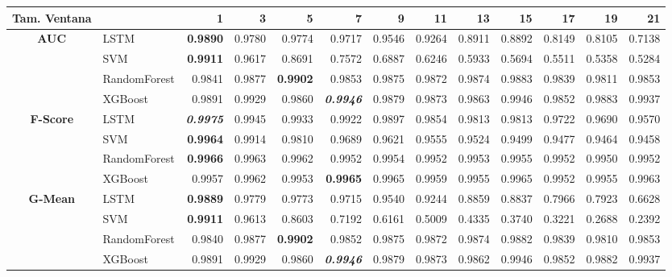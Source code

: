 \begin{table}[H]
	\centering
	\begin{adjustbox}{max width=14cm}
		\begin{tabular}{|c|l|r|r|r|r|r|r|r|r|r|r|r|}
			\hline
			\textbf{Tam. Ventana}&         &      1  &      3  &      5  &      7  &      9  &      11 &      13 &      15 &      17 &      19 &      21 \\
			\hline
			\textbf{AUC} &  LSTM & \textbf{  0.9890 } &  0.9780 &  0.9774 &  0.9717 &  0.9546 &  0.9264 &  0.8911 &  0.8892 &  0.8149 &  0.8105 &  0.7138 \\
			&  SVM & \textbf{  0.9911 } &  0.9617 &  0.8691 &  0.7572 &  0.6887 &  0.6246 &  0.5933 &  0.5694 &  0.5511 &  0.5358 &  0.5284 \\
			&  RandomForest &  0.9841 &  0.9877 & \textbf{  0.9902 } &  0.9853 &  0.9875 &  0.9872 &  0.9874 &  0.9883 &  0.9839 &  0.9811 &  0.9853 \\
			&  XGBoost &  0.9891 &  0.9929 &  0.9860 & \textit{ \textbf{  0.9946 } } &  0.9879 &  0.9873 &  0.9863 &  0.9946 &  0.9852 &  0.9883 &  0.9937 \\
			\hline
			\textbf{F-Score} &  LSTM & \textit{ \textbf{  0.9975 } } &  0.9945 &  0.9933 &  0.9922 &  0.9897 &  0.9854 &  0.9813 &  0.9813 &  0.9722 &  0.9690 &  0.9570 \\
			&  SVM & \textbf{  0.9964 } &  0.9914 &  0.9810 &  0.9689 &  0.9621 &  0.9555 &  0.9524 &  0.9499 &  0.9477 &  0.9464 &  0.9458 \\
			&  RandomForest & \textbf{  0.9966 } &  0.9963 &  0.9962 &  0.9952 &  0.9954 &  0.9952 &  0.9953 &  0.9955 &  0.9952 &  0.9950 &  0.9952 \\
			&  XGBoost &  0.9957 &  0.9962 &  0.9953 & \textbf{  0.9965 } &  0.9965 &  0.9959 &  0.9955 &  0.9965 &  0.9952 &  0.9955 &  0.9963 \\
			\hline
			\textbf{G-Mean} &  LSTM & \textbf{  0.9889 } &  0.9779 &  0.9773 &  0.9715 &  0.9540 &  0.9244 &  0.8859 &  0.8837 &  0.7966 &  0.7923 &  0.6628 \\
			&  SVM & \textbf{  0.9911 } &  0.9613 &  0.8603 &  0.7192 &  0.6161 &  0.5009 &  0.4335 &  0.3740 &  0.3221 &  0.2688 &  0.2392 \\
			&  RandomForest &  0.9840 &  0.9877 & \textbf{  0.9902 } &  0.9852 &  0.9875 &  0.9872 &  0.9874 &  0.9882 &  0.9839 &  0.9810 &  0.9853 \\
			&  XGBoost &  0.9891 &  0.9929 &  0.9860 & \textit{ \textbf{  0.9946 } } &  0.9879 &  0.9873 &  0.9862 &  0.9946 &  0.9852 &  0.9882 &  0.9937 \\

\end{tabular}
\end{adjustbox}
\end{table}
